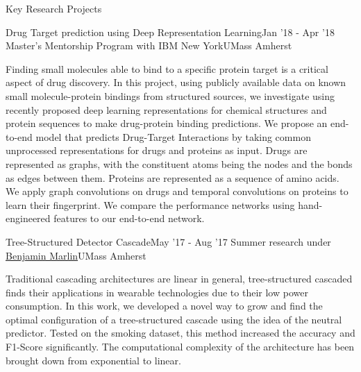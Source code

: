\documentclass{resume} %
\begin{document}
\begin{rSection}{Key Research Projects}
\begin{rSubsection}{ Drug Target prediction using Deep Representation Learning}{Jan '18 - Apr '18}{  Master's Mentorship Program with IBM New York}{UMass Amherst}
\item Finding small molecules able to bind to a specific protein target is a critical aspect of drug discovery. In this project, using publicly available data on known small molecule-protein bindings from structured sources, we investigate using recently proposed deep learning representations for chemical structures and protein sequences to make drug-protein binding predictions. We propose an end-to-end model that predicts Drug-Target Interactions by taking common unprocessed representations for drugs and proteins as input. Drugs are represented as graphs, with the constituent atoms being the nodes and the bonds as edges between them. Proteins are represented as a sequence of amino acids. We apply graph convolutions on drugs and temporal convolutions on proteins to learn their fingerprint. We compare the performance networks using hand-engineered features to our end-to-end network.
\end{rSubsection}
\vspace*{-3mm}
\begin{rSubsection}{ Tree-Structured Detector Cascade}{May '17 - Aug '17}{ Summer research under \href{https://groups.cs.umass.edu/marlin/}{Benjamin Marlin}}{UMass Amherst}
\item Traditional cascading architectures are linear in general, tree-structured cascaded finds their applications in wearable technologies due to their low power consumption. In this work, we developed a novel way to grow and find the optimal configuration of a tree-structured cascade using the idea of the neutral predictor. Tested on the smoking dataset, this method increased the accuracy and F1-Score significantly.  The computational complexity of the architecture has been brought down from exponential to linear. 
\end{rSubsection}
\end{rSection}
\end{document}
